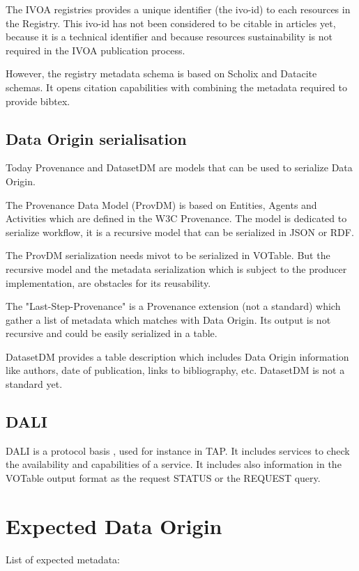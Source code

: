 \documentclass[11pt,a4paper]{ivoa}
\begin{document}
The IVOA registries provides a unique identifier (the ivo-id) to each resources in the Registry. This ivo-id has not been considered to be citable in articles yet, because it is a technical identifier and because resources sustainability is not required in the IVOA publication process.

However, the registry metadata schema is based on Scholix and Datacite schemas. It opens citation capabilities with combining the metadata required to provide bibtex.

\subsection{Data Origin serialisation}
Today Provenance and DatasetDM are models that can be used to serialize Data Origin.

The Provenance Data Model (ProvDM) is based on Entities, Agents and Activities which are defined in the W3C Provenance. The model is dedicated to serialize workflow,
it is a recursive model that can be serialized in JSON or RDF. 

The ProvDM serialization needs mivot to be serialized in VOTable. But the recursive model and the metadata serialization which is subject to the producer implementation, are obstacles for its reusability.


The "Last-Step-Provenance" is a Provenance extension (not a standard) which gather a list of metadata which matches with Data Origin. Its output is not recursive and could be easily serialized in a table.


DatasetDM provides a table description which includes Data Origin information like authors, date of publication, links to bibliography, etc.
DatasetDM is not a standard yet.

\subsection{DALI}
DALI is a protocol basis , used for instance in TAP. It includes services to  check the availability and capabilities of a service. It includes also information in the VOTable output format as the request STATUS or the REQUEST query.


\section{Expected Data Origin}

List of expected metadata:
\end{document}
